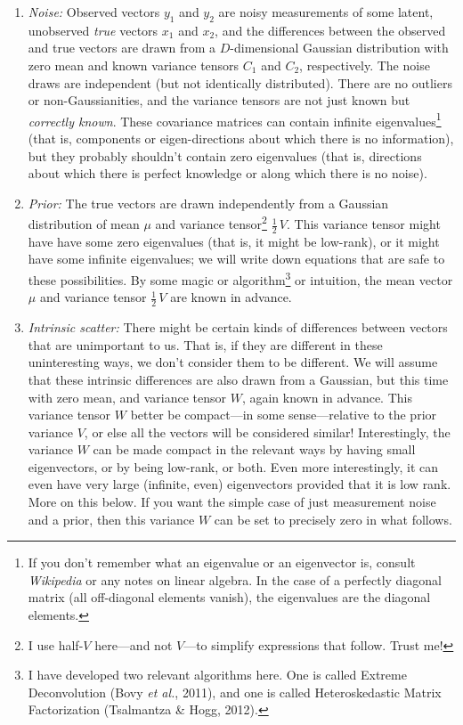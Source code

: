 \documentclass[12pt,letterpaper]{article}
\newcommand{\foreign}[1]{\textsl{#1}}
\newcommand{\etal}{\foreign{et al.}}
\begin{document}
\begin{enumerate}\itemsep0ex
\item \emph{Noise:} Observed vectors $y_1$ and $y_2$ are noisy
  measurements of some latent, unobserved \emph{true} vectors $x_1$
  and $x_2$, and the differences between the observed and true vectors
  are drawn from a $D$-dimensional Gaussian distribution with zero
  mean and known variance tensors $C_1$ and $C_2$, respectively. The
  noise draws are independent (but not identically distributed). There
  are no outliers or non-Gaussianities, and the variance tensors are
  not just known but \emph{correctly known}. These covariance matrices can contain
  infinite eigenvalues\footnote{%
    If you don't remember what an eigenvalue or an eigenvector is,
    consult \textit{Wikipedia} or any notes on linear algebra. In the
    case of a perfectly diagonal matrix (all off-diagonal elements
    vanish), the eigenvalues are the diagonal elements.}
  (that is,
  components or eigen-directions about which there is no information),
  but they probably shouldn't contain zero eigenvalues (that is,
  directions about which there is perfect knowledge or along which there is no noise).
\item \emph{Prior:} The true vectors are drawn independently from a
  Gaussian distribution of mean $\mu$ and variance tensor\footnote{%
    I use half-$V$ here---and not $V$---to simplify expressions that follow. Trust me!}
  $\frac{1}{2}\,V$. This variance tensor might have have some zero
  eigenvalues (that is, it might be low-rank), or it might have some
  infinite eigenvalues; we will write down equations that are safe to
  these possibilities. By some magic or algorithm\footnote{I have
    developed two relevant algorithms here. One is called Extreme
    Deconvolution (Bovy \etal, 2011), and one is called Heteroskedastic
    Matrix Factorization (Tsalmantza \& Hogg, 2012).} or intuition, the mean vector
  $\mu$ and variance tensor $\frac{1}{2}\,V$ are known in advance.
\item \emph{Intrinsic scatter:} There might be certain kinds of differences
  between vectors that are unimportant to us. That is, if they are
  different in these uninteresting ways, we don't consider them to be
  different. We will assume that these intrinsic differences are also
  drawn from a Gaussian, but this time with zero mean, and variance
  tensor $W$, again known in advance. This variance tensor $W$ better
  be compact---in some sense---relative to the prior variance $V$, or
  else all the vectors will be considered similar! Interestingly, the
  variance $W$ can be made compact in the relevant ways by having
  small eigenvectors, or by being low-rank, or both. Even more
  interestingly, it can even have very large (infinite, even)
  eigenvectors provided that it is low rank. More on this below.
  If you want the simple case of just measurement noise and a prior,
  then this variance $W$ can be set to precisely zero in what follows.
\end{enumerate}
\end{document}
